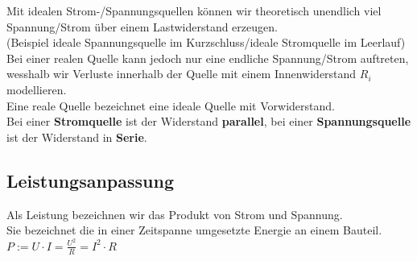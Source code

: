 										\iend


										Mit idealen Strom-/Spannungsquellen können wir theoretisch unendlich viel Spannung/Strom über einem Lastwiderstand erzeugen. \\
										(Beispiel ideale Spannungsquelle im Kurzschluss/ideale Stromquelle im Leerlauf) \\
										Bei einer realen Quelle kann jedoch nur eine endliche Spannung/Strom auftreten, wesshalb wir Verluste innerhalb der Quelle mit einem Innenwiderstand $R_i$ modellieren. \\

										\beginip
										Eine reale Quelle bezeichnet eine ideale Quelle mit Vorwiderstand. \\
										Bei einer \textbf{Stromquelle} ist der Widerstand \textbf{parallel}, bei einer \textbf{Spannungsquelle} ist der Widerstand in \textbf{Serie}.
											\begin{center}
												\fix
											\end{center}
										\iend


										\subsection{Leistungsanpassung}
										\beginip
											Als Leistung bezeichnen wir das Produkt von Strom und Spannung. \\
											Sie bezeichnet die in einer Zeitspanne umgesetzte Energie an einem Bauteil. \\
											\formulaBegin
											$\displaystyle P := U \cdot I = \frac{U^2}{R} = I^2 \cdot R $
											\formulaEnd
										\iend

